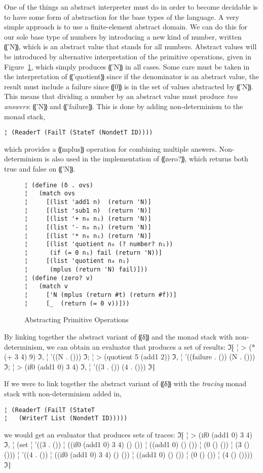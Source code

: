 One of the things an abstract interpreter must do in order to become decidable
is to have some form of abstraction for the base types of the language.  A very
simple approach is to use a finite-element abstract domain.  We can do this for
our sole base type of numbers by introducing a new kind of number, written
⸨'N⸩, which is an abstract value that stands for all numbers.  Abstract values
will be introduced by alternative interpretation of the primitive operations,
given in Figure~\ref{f:abs-delta}, which simply produces ⸨'N⸩ in all cases.
Some care must be taken in the interpretation of ⸨'quotient⸩ since if the
denominator is an abstract value, the result must include a failure since ⸨0⸩
is in the set of values abstracted by ⸨'N⸩.  This means that dividing a number
by an abstract value must produce \emph{two answers}: ⸨'N⸩ and ⸨'failure⸩.
This is done by adding non-determinism to the monad stack,

\begin{lstlisting}
¦ (ReaderT (FailT (StateT (NondetT ID))))
\end{lstlisting}
which provides a ⸨mplus⸩ operation for combining multiple answers.
Non-determinism is also used in the implementation of ⸨zero?⸩, which returns
both true and false on ⸨'N⸩.

\begin{figure}
\begin{lstlisting}
¦ (define (δ . ovs)
¦   (match ovs
¦     [(list 'add1 n)  (return 'N)]
¦     [(list 'sub1 n)  (return 'N)]
¦     [(list '+ n₀ n₁) (return 'N)]
¦     [(list '- n₀ n₁) (return 'N)]
¦     [(list '* n₀ n₁) (return 'N)]
¦     [(list 'quotient n₀ (? number? n₁))
¦      (if (= 0 n₁) fail (return 'N))]
¦     [(list 'quotient n₀ n₁)
¦      (mplus (return 'N) fail)]))
¦ (define (zero? v)
¦   (match v
¦     ['N (mplus (return #t) (return #f))]
¦     [_  (return (= 0 v))]))
\end{lstlisting}
\caption{Abstracting Primitive Operations}
\label{f:abs-delta}
\end{figure}

By linking together the abstract variant of ⸨δ⸩ and the monad stack with
non-determinism, we can obtain an evaluator that produces a set of results:
ℑ⁅
¦ > (* (+ 3 4) 9)
ℑ,
¦ '((N . ()))
ℑ;
¦ > (quotient 5 (add1 2))
ℑ,
¦ '((failure . ()) (N . ()))
ℑ;
¦ > (if0 (add1 0) 3 4)
ℑ,
¦ '((3 . ()) (4 . ()))
ℑ⁆

If we were to link together the abstract variant of ⸨δ⸩ with the \emph{tracing}
monad stack with non-determinism added in,
\begin{lstlisting}
¦ (ReaderT (FailT (StateT 
¦   (WriterT List (NondetT ID)))))
\end{lstlisting}
we would get an evaluator that produces sets of traces:
ℑ⁅
¦ > (if0 (add1 0) 3 4)
ℑ,
¦ (set
¦  '((3 . ())
¦    ((if0 (add1 0) 3 4) () ())
¦    ((add1 0) () ())
¦    (0 () ())
¦    (3 () ()))
¦  '((4 . ())
¦    ((if0 (add1 0) 3 4) () ())
¦    ((add1 0) () ())
¦    (0 () ())
¦    (4 () ())))
ℑ⁆

